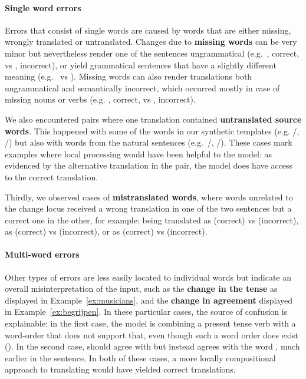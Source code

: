 \paragraph{Single word errors}
Errors that consist of single words are caused by words that are either missing, wrongly translated or untranslated.
Changes due to \textbf{missing words} can be very minor but nevertheless render one of the sentences ungrammatical (e.g.\ , correct, vs , incorrect),
or yield grammatical sentences that have a slightly different meaning (e.g.\  vs ).
Missing words can also render translations both ungrammatical and semantically incorrect, which occurred mostly in case of missing nouns or verbs (e.g. , correct, vs , incorrect).

We also encountered pairs where one translation contained \textbf{untranslated source words}.
This happened with some of the words in our synthetic templates (e.g. /, /) but also with words from the natural sentences (e.g.\ /, /).
These cases mark examples where local processing would have been helpful to the model: as evidenced by the alternative translation in the pair, the model does have access to the correct translation.

Thirdly, we observed cases of \textbf{mistranslated words}, where words unrelated to the change locus received a wrong translation in one of the two sentences but a correct one in the other, for example:
	 being translated as  (correct) vs  (incorrect),  as  (correct) vs  (incorrect), or  as  (correct) vs  (incorrect).

\paragraph{Multi-word errors} Other types of errors are less easily located to individual words but indicate an overall misinterpretation of the input, such as the \textbf{change in the tense} as displayed in Example~\ref{ex:musicians},
and the \textbf{change in agreement} displayed in Example~\ref{ex:begrijpen}.
In these particular cases, the source of confusion is explainable: in the first case, the model is combining a present tense verb with a word-order that does not support that, even though such a word order does exist ().
In the second case,  should agree with  but instead agrees with the word , much earlier in the sentence.
In both of these cases, a more locally compositional approach to translating would have yielded correct translations.

